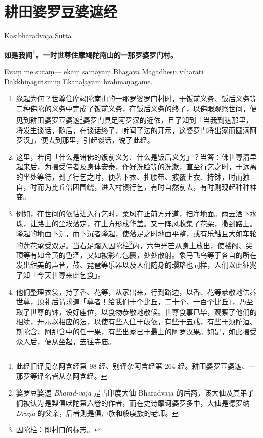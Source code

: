 \section{耕田婆罗豆婆遮经}

\begin{center}Kasibhāradvāja Sutta\end{center}\vspace{1em}

\textbf{如是我闻\footnote{此经旧译见杂阿含经第 98 经、别译杂阿含经第 264 经。耕田婆罗豆婆遮、一那罗等译名皆从杂阿含经。}。一时世尊住摩竭陀南山的一那罗婆罗门村。}

Evaṃ me sutaṃ— ekaṃ samayaṃ Bhagavā Magadhesu viharati Dakkhiṇāgirismiṃ Ekanāḷāyaṃ brāhmaṇagāme.

\begin{enumerate}\item 缘起为何？世尊住摩竭陀南山的一那罗婆罗门村时，于饭前义务、饭后义务等二种佛陀的义务中完成了饭前义务，在饭后义务的终了，以佛眼观察世间，便见到耕田婆罗豆婆遮\footnote{婆罗豆婆遮 \textit{Bhārad-vāja} 是古印度大仙 Bharadvāja 的后裔，该大仙及其弟子们被认为是梨俱吠陀第六卷的作者，而在史诗摩诃婆罗多中，大仙是德罗纳 \textit{Droṇa} 的父亲，后者则是俱卢族和般度族的老师。}婆罗门具足阿罗汉的近依，且了知到「当我到达那里，将发生谈话，随后，在谈话终了，听闻了法的开示，这婆罗门将出家而圆满阿罗汉」，便去到那里，引起谈话，说了此经。
\item 这里，若问「什么是诸佛的饭前义务、什么是饭后义务」？当答：佛世尊清早起来后，为摄受侍者及身体安泰，作好洗脸等的洗漱，直至行乞之时，于远离的坐处等待，到了行乞之时，便著下衣、扎腰带、披覆上衣、持钵，时而独自，时而为比丘僧团围绕，进入村镇行乞，有时自然前去，有时则现起种种神变。
\item 例如，在世间的依怙进入行乞时，柔风在正前方开道，扫净地面。雨云洒下水珠，让路上的尘埃落定，在上方形成华盖。又一阵风收集了花朵，撒到路上。隆起的地面下沉，而下沉者隆起，使落足之时地面平整，或有乐触且大如车轮的莲花承受双足。当右足踏入因陀柱\footnote{因陀柱：即村口的标志。}内，六色光芒从身上放出，使楼阁、尖顶等有如金黄的色泽，又如被彩布包裹，处处散射。象马飞鸟等于各自的所在发出甜美的声音，鼓、琵琶等乐器以及人们随身的璎珞也同样，人们以此征兆了知「今天世尊来此乞食」。
\item 他们整理衣裳，持了香、花等，从家出来，行到路边，以香、花等恭敬地供养世尊，顶礼后请求道「尊者！给我们十个比丘，二十个、一百个比丘」，乃至取了世尊的钵，设好座位，以食物恭敬地敬候。世尊食事已毕，观察了他们的相续，开示以相应的法，以使有些人住于皈依，有些于五戒，有些于须陀洹、斯陀含、阿那含中的任一果，有些出家已于最上的阿罗汉果。如是，如此摄受众人后，便从坐起，去往寺庙。

\end{enumerate}
